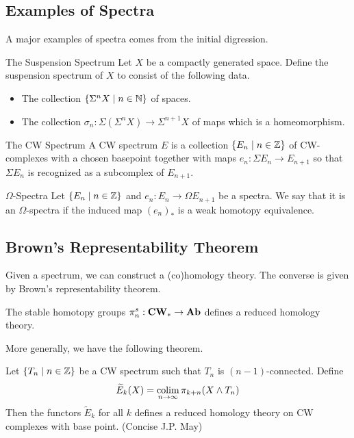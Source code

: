 \documentclass[a4paper]{article}
\begin{document}
\subsection{Examples of Spectra}
A major examples of spectra comes from the initial digression. 

\begin{defn}{The Suspension Spectrum}{} Let $X$ be a compactly generated space. Define the suspension spectrum of $X$ to consist of the following data. 
\begin{itemize}
\item The collection $\{\Sigma^n X\;|\;n\in\mathbb{N}\}$ of spaces. 
\item The collection $\sigma_n:\Sigma(\Sigma^nX)\to\Sigma^{n+1}X$ of maps which is a homeomorphism. 
\end{itemize}
\end{defn}

\begin{defn}{The CW Spectrum}{} A CW spectrum $E$ is a collection $\{E_n\;|\;n\in\mathbb{Z}\}$ of CW-complexes with a chosen basepoint together with maps $e_n:\Sigma E_n\to E_{n+1}$ so that $\Sigma E_n$ is recognized as a subcomplex of $E_{n+1}$. 
\end{defn}

\begin{defn}{$\Omega$-Spectra}{} Let $\{E_n\;|\;n\in\mathbb{Z}\}$ and $e_n:E_n\to\Omega E_{n+1}$ be a spectra. We say that it is an $\Omega$-spectra if the induced map $(e_n)_\ast$ is a weak homotopy equivalence. 
\end{defn}

\subsection{Brown's Representability Theorem}
Given a spectrum, we can construct a (co)homology theory. The converse is given by Brown's representability theorem. 

\begin{thm}{}{} The stable homotopy groups $\pi_n^s:\bold{CW}_\ast\to\bold{Ab}$ defines a reduced homology theory. 
\end{thm}

More generally, we have the following theorem. 

\begin{thm}{}{} Let $\{T_n\;|\;n\in\mathbb{Z}\}$ be a CW spectrum such that $T_n$ is $(n-1)$-connected. Define $$\widetilde{E}_k(X)=\operatorname*{colim}_{n\to\infty}\pi_{k+n}(X\wedge T_n)$$ Then the functors $\widetilde{E}_k$ for all $k$ defines a reduced homology theory on CW complexes with base point. (Concise J.P. May)
\end{thm}
\end{document}
